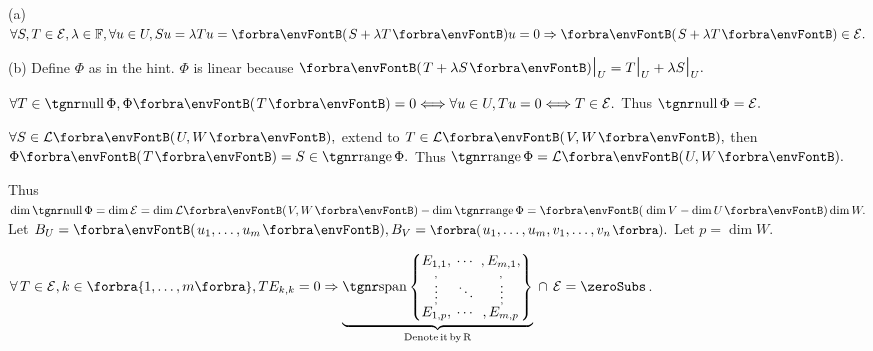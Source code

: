 \par\quad
(a) \,$\forall S,T\in\mathcal{E},\lambda\in\Fbb,\forall u\in U,Su=\lambda Tu=\Par{S+\lambda T}u=0\Rightarrow\Par{S+\lambda T}\in\mathcal{E}.$\par\quad
(b) Define $\Phi$ as in the hint. $\Phi$ is linear because $\Par{T+\lambda S}\mmid_U=T\mmid_U+\lambda S\mmid_U.$\vspace{2pt}\par\quad\Hb
$\forall T\in\null\Phi,\Phi\Par{T}=0\Longleftrightarrow\forall u\in U,Tu=0\Longleftrightarrow T\in\mathcal{E}.$ Thus $\null\Phi=\mathcal{E}.$\par\quad\Hb
$\forall S\in\Lm{U,W},$ extend to $T\in\Lm{V,W},$ then $\Phi\Par{T}=S\in\range\Phi.$ Thus $\range\Phi=\Lm{U,W}.$\vspace{2pt}\par\quad\Hb
Thus $\dim\null\Phi=\dim\mathcal{E}=\dim\Lm{V,W}-\dim\range\Phi=\Par{\dim V-\dim U}\dim W.$\PfEnd\vspace{6pt}\quad\Hb
\Or Let $B_U=\Par{u_1,\dots,u_m},B_V=\BigPar{u_1,\dots,u_m,v_1,\dots,v_n}.$ Let $p=\dim W$. \par\vspace{2pt}\quad\Hb
$\forall \,T\in\mathcal{E},k\in\Bra{1,\dots,m},TE_{k,k}=0\Rightarrow{\normalsize\underbrace{\Spn\!\begin{Bmatrix} \underset{\;,}{E_{1,1}}, &\hspace{-6pt} \cdots &\hspace{-6pt} ,\underset{\!,}{E_{m,1}},\\[-2pt] \vdots &\hspace{-6pt} \ddots &\hspace{-6pt} \,\vdots\\[-2pt] \overset{\;,}{E_{1,p}}, &\hspace{-6pt} \cdots &\hspace{-6pt} ,\overset{\!\!,}{E_{m,p}}\end{Bmatrix}}_{\text{Denote\,it\,by\,R}}}\,\cap\,\mathcal{E}=\zeroSubs$.\vspace{-32pt}\par\Hb
